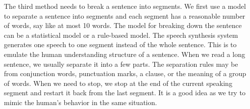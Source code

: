 \documentclass[12pt]{article}
\newenvironment{problem}[2][Problem]{\begin{trivlist}
\item[\hskip \labelsep {\bfseries #1}\hskip \labelsep {\bfseries #2.}]}{\end{trivlist}}
\begin{document}
\begin{problem}{2.3}
    The third method needs to break a sentence into segments. 
    We first use a model to separate a sentence into segments and each segment 
    has a reasonable number of words, say like at most 10 words. 
    The model for breaking down the sentence can be a statistical model or a 
    rule-based model. 
    The speech synthesis system generates one speech to one segment instead of 
    the whole sentence.
    This is to emulate the human understanding structure of a sentence. 
    When we read a long sentence, we usually separate it into a few parts. 
    The separation rules may be from conjunction words, punctuation marks, 
    a clause, or the meaning of a group of words. 
    When we need to stop, we stop at the end of the current speaking segment 
    and restart it back from the last segment. It is a good idea as we try to mimic
    the human's behavior in the same situation.
\end{problem}
\end{document}
